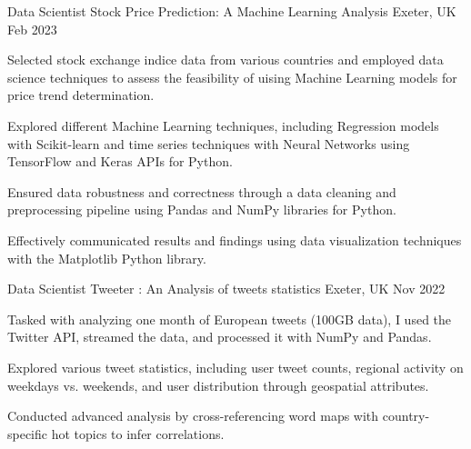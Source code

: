   
\begin{cventries}
  \cventry
  {Data Scientist} %
  {Stock Price Prediction: A Machine Learning Analysis} %
  {Exeter, UK} %
  {Feb 2023} %
  {
    \begin{cvitems} %
      \item {Selected stock exchange indice data from various countries and employed data science techniques to assess the feasibility of uising Machine Learning models for price trend determination.}
      \item{Explored different Machine Learning techniques, including Regression models with Scikit-learn and time series techniques with Neural Networks using TensorFlow and Keras APIs for Python.}
      \item{Ensured data robustness and correctness through a data cleaning and preprocessing pipeline using Pandas and NumPy libraries for Python.}
      \item{Effectively communicated results and findings using data visualization techniques with the Matplotlib Python library.}
    \end{cvitems}
  }%
  \cventry
  {Data Scientist}
  {Tweeter : An Analysis of tweets statistics}
  {Exeter, UK}
  {Nov 2022}
  {
    \begin{cvitems}
      \item {Tasked with analyzing one month of European tweets (100GB data), I used the Twitter API, streamed the data, and processed it with NumPy and Pandas.}
      \item{Explored various tweet statistics, including user tweet counts, regional activity on weekdays vs. weekends, and user distribution through geospatial attributes.}
      \item{Conducted advanced analysis by cross-referencing word maps with country-specific hot topics to infer correlations.}

\end{cvitems}}
\end{cventries}
